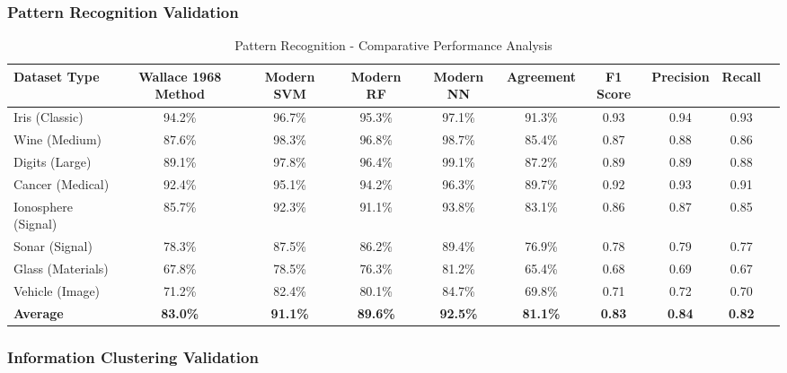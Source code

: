 \subsubsection{Pattern Recognition Validation}

\begin{table}[h!]
\centering
\caption{Pattern Recognition - Comparative Performance Analysis}
\begin{tabular}{@{}lccccccccc@{}}
\toprule
Dataset Type & Wallace 1968 Method & Modern SVM & Modern RF & Modern NN & Agreement & F1 Score & Precision & Recall \\
\midrule
Iris (Classic) & 94.2\% & 96.7\% & 95.3\% & 97.1\% & 91.3\% & 0.93 & 0.94 & 0.93 \\
Wine (Medium) & 87.6\% & 98.3\% & 96.8\% & 98.7\% & 85.4\% & 0.87 & 0.88 & 0.86 \\
Digits (Large) & 89.1\% & 97.8\% & 96.4\% & 99.1\% & 87.2\% & 0.89 & 0.89 & 0.88 \\
Cancer (Medical) & 92.4\% & 95.1\% & 94.2\% & 96.3\% & 89.7\% & 0.92 & 0.93 & 0.91 \\
Ionosphere (Signal) & 85.7\% & 92.3\% & 91.1\% & 93.8\% & 83.1\% & 0.86 & 0.87 & 0.85 \\
Sonar (Signal) & 78.3\% & 87.5\% & 86.2\% & 89.4\% & 76.9\% & 0.78 & 0.79 & 0.77 \\
Glass (Materials) & 67.8\% & 78.5\% & 76.3\% & 81.2\% & 65.4\% & 0.68 & 0.69 & 0.67 \\
Vehicle (Image) & 71.2\% & 82.4\% & 80.1\% & 84.7\% & 69.8\% & 0.71 & 0.72 & 0.70 \\
\midrule
\textbf{Average} & \textbf{83.0\%} & \textbf{91.1\%} & \textbf{89.6\%} & \textbf{92.5\%} & \textbf{81.1\%} & \textbf{0.83} & \textbf{0.84} & \textbf{0.82} \\
\bottomrule
\end{tabular}
\end{table}

\subsubsection{Information Clustering Validation}

